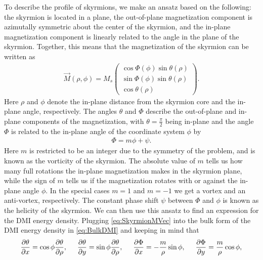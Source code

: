 \documentclass[12pt, a4paper, twoside, openright]{article}		%
\numberwithin{equation}{section}
\begin{document}
To describe the profile of skyrmions, we make an ansatz based on the following: the skyrmion is located in a plane, the out-of-plane magnetization component is azimutally symmetric about the center of the skyrmion, and the in-plane magnetization component is linearly related to the angle in the plane of the skyrmion. Together, this means that the magnetization of the skyrmion can be written as
\begin{align}
\label{eq:SkyrmionMVec}
\vec{M}(\rho, \phi) = M_s
\begin{pmatrix}
\cos\Phi(\phi)\sin\theta(\rho) \\ \sin\Phi(\phi)\sin\theta(\rho) \\ \cos\theta(\rho)
\end{pmatrix}.
\end{align}
Here $\rho$ and $\phi$ denote the in-plane distance from the skyrmion core and the in-plane angle, respectively. The angles $\theta$ and $\Phi$ describe the out-of-plane and in-plane components of the magnetization, with $\theta = \frac{\pi}{2}$ being in-plane and the angle $\Phi$ is related to the in-plane angle of the coordinate system $\phi$ by
\begin{align}
\label{eq:SkyrmionPhi}
\Phi = m\phi + \psi.
\end{align}
Here $m$ is restricted to be an integer due to the symmetry of the problem, and is known as the vorticity of the skyrmion. The absolute value of $m$ tells us how many full rotations the in-plane magnetization makes in the skyrmion plane, while the sign of $m$ tells us if the magnetization rotates with or against the in-plane angle $\phi$. In the special cases $m=1$ and $m=-1$ we get a vortex and an anti-vortex, respectively. The constant phase shift $\psi$ between $\Phi$ and $\phi$ is known as the helicity of the skyrmion. We can then use this ansatz to find an expression for the DMI energy density. Plugging \eqref{eq:SkyrmionMVec} into the bulk form of the DMI energy density in \eqref{eq:BulkDMI} and keeping in mind that
\begin{align}
\frac{\partial \theta}{\partial x} = \cos\phi \frac{\partial\theta}{\partial\rho}, \hspace{5mm}
\frac{\partial \theta}{\partial y} = \sin\phi \frac{\partial\theta}{\partial\rho}, \hspace{5mm}
\frac{\partial \Phi}{\partial x} = -\frac{m}{\rho}\sin\phi, \hspace{5mm}
\frac{\partial \Phi}{\partial y} = \frac{m}{\rho}\cos\phi,
\end{align}
\end{document}
